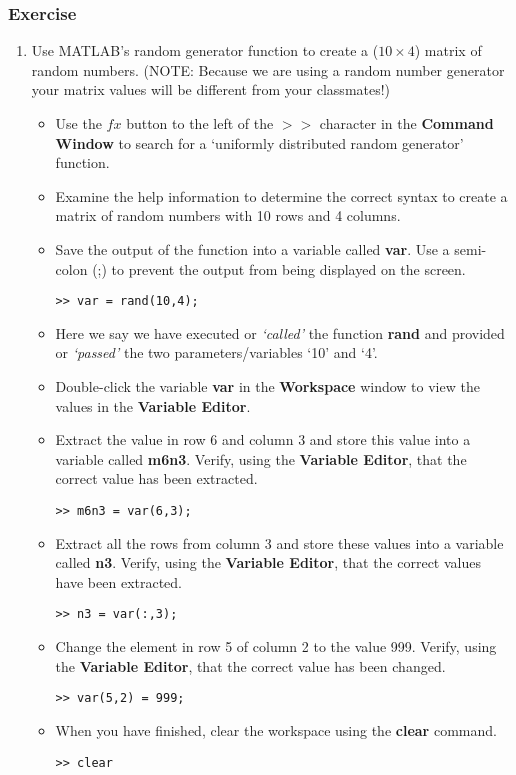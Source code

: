 \documentclass[12pt,a4paper]{article}
\begin{document}
		
\subsubsection*{Exercise}
\begin{enumerate}
	\item Use MATLAB's random generator function to create a ($10\times4$) matrix of random numbers. (NOTE: Because we are using a random number generator your matrix values will be different from your classmates!)
    	\begin{itemize}
    		\item Use the $fx$ button to the left of the $>>$ character in the \textbf{Command Window} to search for a `uniformly distributed random generator' function.
    		\item Examine the help information to determine the correct syntax to create a matrix of random numbers with 10 rows and 4 columns.		
    		\item Save the output of the function into a variable called \textbf{var}.  Use a semi-colon (;) to prevent the output from being displayed on the screen.
    		\begin{lstlisting}[style=Matlab-editor]
    >> var = rand(10,4);
    		\end{lstlisting}	
    		\item Here we say we have executed or \emph{`called'} the function \textbf{rand} and provided or \emph{`passed'} the two parameters/variables `10'  and `4'.
    		\item Double-click the variable \textbf{var} in the \textbf{Workspace} window to view the values in the \textbf{Variable Editor}.
    		\item Extract the value in row 6 and column 3 and store this value into a variable called \textbf{m6n3}.  Verify, using the \textbf{Variable Editor}, that the correct value has been extracted.
    		\begin{lstlisting}[style=Matlab-editor]
    >> m6n3 = var(6,3);
    		\end{lstlisting}
    		\item Extract all the rows from column 3 and store these values into a variable called \textbf{n3}.  Verify, using the \textbf{Variable Editor}, that the correct values have been extracted.
    		\begin{lstlisting}[style=Matlab-editor]
    >> n3 = var(:,3);
    		\end{lstlisting}	
    		\item Change the element in row 5 of column 2 to the value 999.  Verify, using the \textbf{Variable Editor}, that the correct value has been changed.
    		\begin{lstlisting}[style=Matlab-editor]
    >> var(5,2) = 999;
    		\end{lstlisting}	
    		\item When you have finished, clear the workspace using the \textbf{clear} command.
    		\begin{lstlisting}[style=Matlab-editor]
    >> clear
    
    		\end{lstlisting}	
    	\end{itemize}
\end{enumerate}
\end{document}
